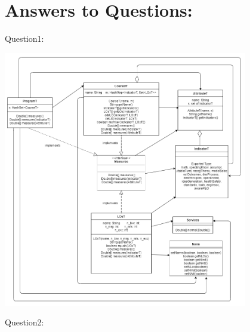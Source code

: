 \documentclass[12pt]{article}
\begin{document}
\section*{Answers to Questions:}

Question1: \\

\begin{center}
  \includegraphics[width=0.8\textwidth]{A3UML.png}
\end{center}

\newpage

Question2: \\
\end{document}
